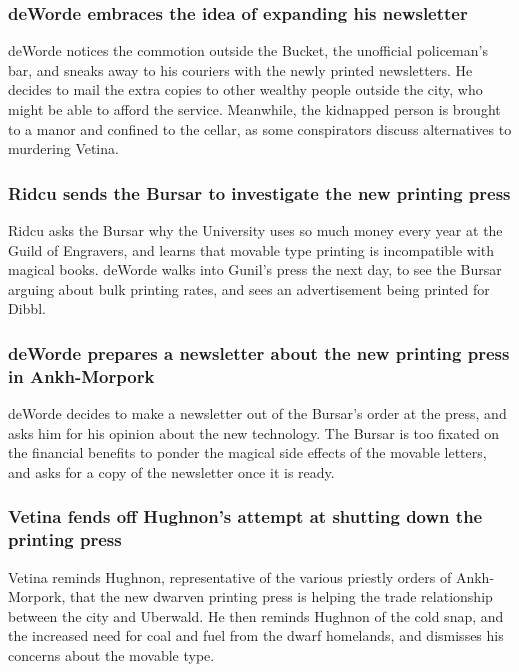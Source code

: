 \subsubsection{\Gls{deWorde} embraces the idea of expanding his newsletter}
\Gls{deWorde} notices the commotion outside the Bucket, the unofficial policeman's bar, and sneaks
away to his couriers with the newly printed newsletters. He decides to mail the extra copies to
other wealthy people outside the city, who might be able to afford the service. Meanwhile, the
kidnapped person is brought to a manor and confined to the cellar, as some conspirators discuss
alternatives to murdering \Gls{Vetina}.

\subsubsection{\Gls{Ridcu} sends the \Gls{Bursar} to investigate the new printing press}
\Gls{Ridcu} asks the \Gls{Bursar} why the University uses so much money every year at the Guild of
Engravers, and learns that movable type printing is incompatible with magical books. \Gls{deWorde}
walks into \Gls{Gunil}'s press the next day, to see the \Gls{Bursar} arguing about bulk printing
rates, and sees an advertisement being printed for \Gls{Dibbl}.

\subsubsection{\Gls{deWorde} prepares a newsletter about the new printing press in Ankh-Morpork}
\Gls{deWorde} decides to make a newsletter out of the \Gls{Bursar}'s order at the press, and asks
him for his opinion about the new technology. The \Gls{Bursar} is too fixated on the financial
benefits to ponder the magical side effects of the movable letters, and asks for a copy of the
newsletter once it is ready.

\subsubsection{\Gls{Vetina} fends off \Gls{Hughnon}'s attempt at shutting down the printing press}
\Gls{Vetina} reminds \Gls{Hughnon}, representative of the various priestly orders of Ankh-Morpork,
that the new dwarven printing press is helping the trade relationship between the city and
Uberwald. He then reminds \Gls{Hughnon} of the cold snap, and the increased need for coal and fuel
from the dwarf homelands, and dismisses his concerns about the movable type.

